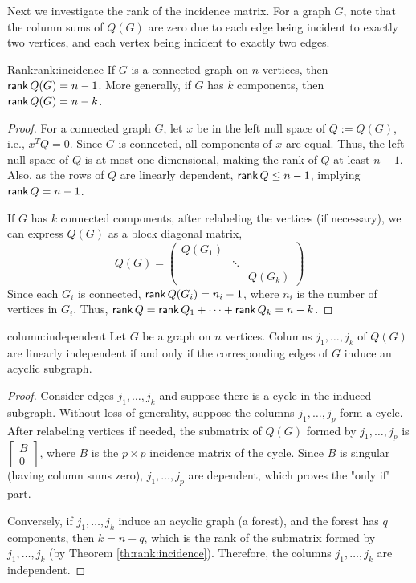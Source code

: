 \documentclass[../basic_graph_theory.tex]{subfiles}
\begin{document}
\ssk

Next we investigate the rank of the incidence matrix. For a graph \(G\), note that the column sums of \(Q(G)\) are zero due to each edge being incident to exactly two vertices, and each vertex being incident to exactly two edges.

\begin{Thm}{Rank}{rank:incidence}
  If \(G\) is a connected graph on \(n\) vertices, then \(\operatorname{\mathsf{rank}} Q(G) = n - 1\). More generally, if \(G\) has \(k\) components, then \(\operatorname{\mathsf{rank}} Q(G) = n - k\).
\end{Thm}
\begin{proof}
  For a connected graph \(G\), let \(x\) be in the left null space of \(Q := Q(G)\), i.e., \(x^TQ = 0\). Since \(G\) is connected, all components of \(x\) are equal. Thus, the left null space of \(Q\) is at most one-dimensional, making the rank of \(Q\) at least \(n - 1\). Also, as the rows of \(Q\) are linearly dependent, \(\operatorname{\mathsf{rank}} Q \leq n - 1\), implying \(\operatorname{\mathsf{rank}} Q = n - 1\).

  If \(G\) has \(k\) connected components, after relabeling the vertices (if necessary), we can express \(Q(G)\) as a block diagonal matrix,
  \[
    Q(G) = \begin{pmatrix} Q(G_1) & & \\ & \ddots & \\ & & Q(G_k) \end{pmatrix}
  \]
  Since each \(G_i\) is connected, \(\operatorname{\mathsf{rank}} Q(G_i) = n_i - 1\), where \(n_i\) is the number of vertices in \(G_i\). Thus, \(\operatorname{\mathsf{rank}} Q = \operatorname{\mathsf{rank}} Q_1 + \dots + \operatorname{\mathsf{rank}} Q_k = n - k\).
\end{proof}

\begin{Thm}{}{column:independent}
  Let \(G\) be a graph on \(n\) vertices. Columns \(j_1, \dots, j_k\) of \(Q(G)\) are linearly independent if and only if the corresponding edges of \(G\) induce an acyclic subgraph.
\end{Thm}
\begin{proof}
  Consider edges \(j_1, \dots, j_k\) and suppose there is a cycle in the induced subgraph. Without loss of generality, suppose the columns \(j_1, \dots, j_p\) form a cycle. After relabeling vertices if needed, the submatrix of \(Q(G)\) formed by \(j_1, \dots, j_p\) is \(\begin{bmatrix} B \\ 0 \end{bmatrix}\), where \(B\) is the \(p \times p\) incidence matrix of the cycle. Since \(B\) is singular (having column sums zero), \(j_1, \dots, j_p\) are dependent, which proves the "only if" part.

  Conversely, if \(j_1, \dots, j_k\) induce an acyclic graph (a forest), and the forest has \(q\) components, then \(k = n - q\), which is the rank of the submatrix formed by \(j_1, \dots, j_k\) (by Theorem \ref{th:rank:incidence}). Therefore, the columns \(j_1, \dots, j_k\) are independent.
\end{proof}
\end{document}
